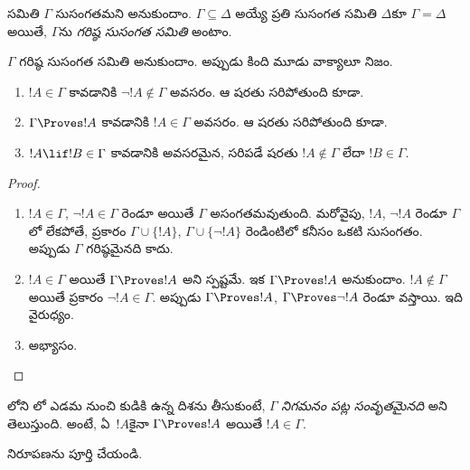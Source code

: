 \documentclass[../../../include/open-logic-section]{subfiles}
\begin{document}


\begin{defn}
 సమితి $\Gamma$ సుసంగతమని అనుకుందాం. $\Gamma \subseteq \Delta$ అయ్యే ప్రతి సుసంగత సమితి $\Delta$కూ $\Gamma = \Delta$ అయితే, $\Gamma$ను \emph{గరిష్ఠ సుసంగత సమితి} అంటాం.
\end{defn}

\begin{lem}[సత్య ఉపసిద్ధాంతం]
$\Gamma$ గరిష్ఠ సుసంగత సమితి అనుకుందాం. అప్పుడు కింది మూడు వాక్యాలూ నిజం.
\begin{enumerate}
\item {} $!A \in \Gamma$ కావడానికి $\lnot !A \notin \Gamma$ అవసరం. ఆ షరతు సరిపోతుంది కూడా.
\item {} $\Gamma \Proves !A$ కావడానికి $!A \in \Gamma$ అవసరం. ఆ షరతు సరిపోతుంది కూడా.
\item {} $!A \lif !B \in \Gamma$ కావడానికి అవసరమైన, సరిపడే షరతు $!A \notin \Gamma$ లేదా $!B \in \Gamma$.
\end{enumerate}
\end{lem}

\begin{proof}
\begin{enumerate}
\item $!A \in \Gamma$, $\lnot !A \in \Gamma$ రెండూ అయితే $\Gamma$ అసంగతమవుతుంది. మరోవైపు, $!A$, $\lnot!A$ రెండూ $\Gamma$లో లేకపోతే,  ప్రకారం $\Gamma\cup\{!A\}$, $\Gamma \cup \{\lnot !A\}$ రెండింటిలో కనీసం ఒకటి సుసంగతం. అప్పుడు $\Gamma$ గరిష్ఠమైనది కాదు.
\item $!A \in \Gamma$ అయితే $\Gamma \Proves !A$ అని స్పష్టమే. ఇక $\Gamma \Proves !A$ అనుకుందాం. $!A \notin \Gamma$ అయితే  ప్రకారం $\lnot !A \in \Gamma$. అప్పుడు $\Gamma \Proves !A$, $\Gamma \Proves \lnot !A$ రెండూ వస్తాయి. ఇది వైరుధ్యం.
\item అభ్యాసం.
\end{enumerate}
\end{proof}

లోని లో ఎడమ నుంచి కుడికి ఉన్న దిశను తీసుకుంటే, $\Gamma$ \emph{నిగమనం పట్ల సంవృతమైనది} అని తెలుస్తుంది. అంటే, ఏ~$!A$కైనా $\Gamma \Proves !A$ అయితే $!A \in \Gamma$.

\begin{prob}
 నిరూపణను పూర్తి చేయండి.
\end{prob}
\end{document}
